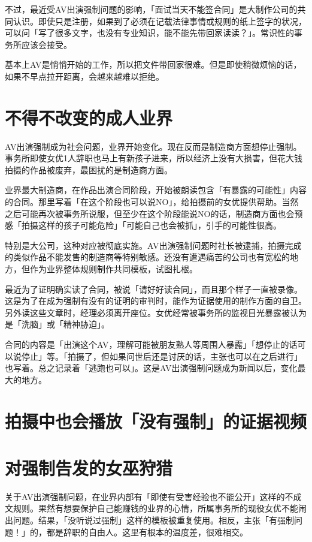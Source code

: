 \documentclass[12pt,UTF8]{ctexbook}
\begin{document}
不过，最近受AV出演强制问题的影响，「面试当天不能签合同」是大制作公司的共同认识。即使只是注册，如果到了必须在记载法律事情或规则的纸上签字的状况，可以问「写了很多文字，也没有专业知识，能不能先带回家读读？」。常识性的事务所应该会接受。

基本上AV是悄悄开始的工作，所以把文件带回家很难。但是即使稍微烦恼的话，如果不早点拉开距离，会越来越难以拒绝。

\section{不得不改变的成人业界}

AV出演强制成为社会问题，业界开始变化。现在反而是制造商方面想停止强制。事务所即使女优1人辞职也马上有新孩子进来，所以经济上没有大损害，但花大钱拍摄的作品被废弃，最困扰的是制造商方面。

业界最大制造商，在作品出演合同阶段，开始被朗读包含「有暴露的可能性」内容的合同。那里写着「在这个阶段也可以说NO」，给拍摄前的女优提供帮助。当然之后可能再次被事务所说服，但至少在这个阶段能说NO的话，制造商方面也会预感「拍摄这样的孩子可能危险」「可能自己也会被抓」，引手的可能性很高。

特别是大公司，这种对应被彻底实施。AV出演强制问题时社长被逮捕，拍摄完成的类似作品不能发售的制造商等特别敏感。还没有遭遇痛苦的公司也有宽松的地方，但作为业界整体规则制作共同模板，试图扎根。

最近为了证明确实读了合同，被说「请好好读合同」，而且那个样子一直被录像。这是为了在成为强制有没有的证明的审判时，能作为证据使用的制作方面的自卫。另外读这些文章时，经理必须离开座位。女优经常被事务所的监视目光暴露被认为是「洗脑」或「精神胁迫」。

合同的内容是「出演这个AV，理解可能被朋友熟人等周围人暴露」「想停止的话可以说停止」等。「拍摄了，但如果问世后还是讨厌的话，主张也可以在之后进行」也写着。总之记录着「逃跑也可以」。这是AV出演强制问题成为新闻以后，变化最大的地方。

\section{拍摄中也会播放「没有强制」的证据视频}

\section{对强制告发的女巫狩猎}

关于AV出演强制问题，在业界内部有「即使有受害经验也不能公开」这样的不成文规则。果然有想要保护自己能赚钱的业界的心情，所属事务所的现役女优不能闹出问题。结果，「没听说过强制」这样的模板被重复使用。相反，主张「有强制问题！」的，都是辞职的自由人。这里有根本的温度差，很难相交。
\end{document}
